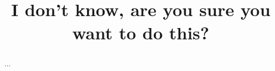 \documentclass[wrr, draft]{agutex}
\begin{document}

\title{I don't know, are you sure you want to do this?}








\begin{abstract}
...
\end{abstract}


\end{document}
